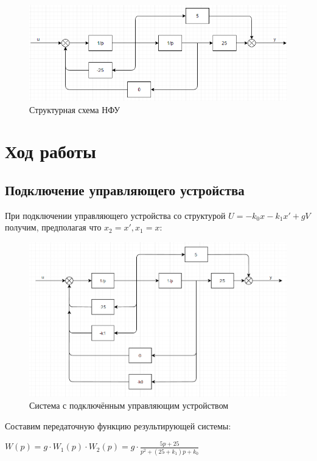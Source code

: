 \documentclass[14pt,a4paper,report]{report}
\begin{document}
\begin{figure}[h!]
	\centering
	\includegraphics[scale = 0.73]{images/nfu.png}
	\caption{Структурная схема НФУ}
	\label{image:1}
\end{figure}	

\clearpage

\section{Ход работы}

\subsection{Подключение управляющего устройства}

При подключении управляющего устройства со структурой $U=-k_0x-k_1x'+gV$ получим, предполагая что $x_2=x', x_1=x$:

\begin{figure}[h!]
	\centering
	\includegraphics[scale = 0.60]{images/uunfu.png}
	\caption{Система с подключённым управляющим устройством}
	\label{image:2}
\end{figure}	

Составим передаточную функцию результирующей системы:

$W(p)=g\cdot W_1(p)\cdot W_2(p)=g\cdot \frac{5p+25}{p^2+(25+k_1)p+k_0}$
\end{document}
